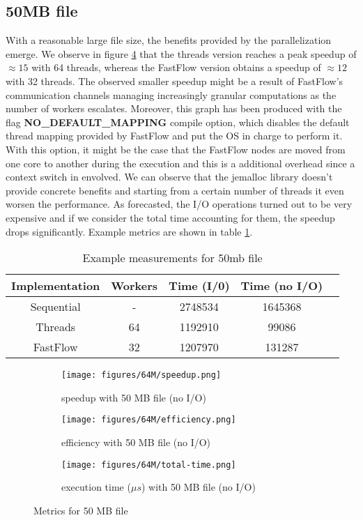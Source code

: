 \documentclass{article}
\begin{document}
\subsection{50MB file}
With a reasonable large file size, the benefits provided by the parallelization emerge.
We observe in figure \ref{fig:50mb} that the threads version reaches a peak speedup of $\approx 15$ with 64 threads,
whereas the FastFlow version obtains a speedup of $\approx 12$ with 32 threads.
The observed smaller speedup might be a result of FastFlow's communication channels managing
increasingly granular computations as the number of workers escalates.
Moreover, this graph has been produced with the flag \textbf{NO\_DEFAULT\_MAPPING}
compile option, which
disables the default thread mapping provided by FastFlow and put the OS in charge to perform it.
With this option, it might be the case that the FastFlow nodes are moved from one core to another
during the execution and this is a additional overhead since a context switch in envolved.
We can observe that the jemalloc library doesn't provide concrete benefits
and starting from a certain number of threads it even worsen the performance.
As forecasted, the I/O operations turned out to be very expensive and if
we consider the total time accounting for them, the speedup drops significantly.
Example metrics are shown in table \ref{tab:measurements}.
\begin{table}[H]
    \centering
    \begin{tabular}{|c|c|c|c|c|}
        \hline
        Implementation & Workers & Time (I/0) & Time (no I/O) \\
        \hline
        Sequential     & -       & 2748534    & 1645368       \\
        Threads        & 64      & 1192910    & 99086         \\
        FastFlow       & 32      & 1207970    & 131287        \\
        \hline
    \end{tabular}
    \caption{Example measurements for 50mb file}
    \label{tab:measurements}
\end{table}

\begin{figure}
    \begin{subfigure}{0.6\textwidth}
        \centering
        \texttt{[image: figures/64M/speedup.png]}
        \caption{speedup with 50 MB file (no I/O)}
        \label{fig:speedup-50mb}
    \end{subfigure}
    \begin{subfigure}{0.6\textwidth}
        \centering
        \texttt{[image: figures/64M/efficiency.png]}
        \caption{efficiency with 50 MB file (no I/O)}
        \label{fig:efficiency-50mb}
    \end{subfigure}
    \begin{subfigure}{0.6\textwidth}
        \centering
        \texttt{[image: figures/64M/total-time.png]}
        \caption{execution time ($\mu s$) with 50 MB file (no I/O)}
        \label{fig:total-time-50mb}
    \end{subfigure}
    \caption{Metrics for 50 MB file}
    \label{fig:50mb}
\end{figure}
\end{document}
